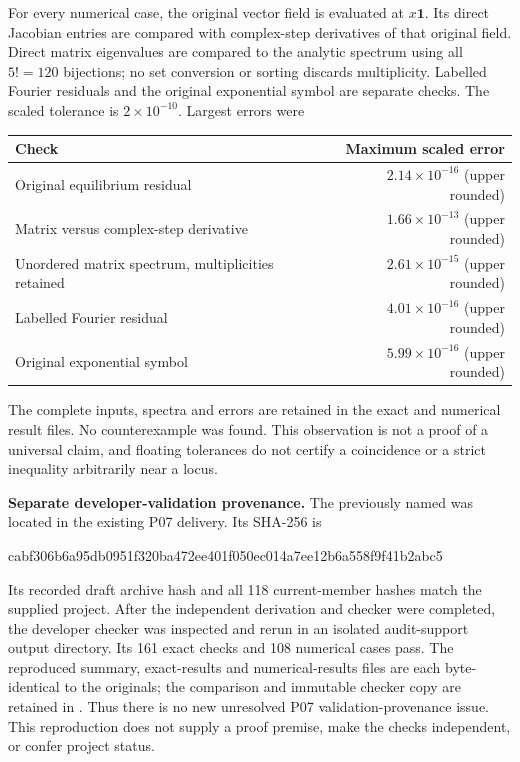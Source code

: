 \documentclass[11pt]{article}
\newcommand{\one}{\mathbf{1}}
\newcommand{\sha}[2]{\par{\small\ttfamily #1\allowbreak #2}\par}
\begin{document}
For every numerical case, the original vector field is evaluated at
$x\one$. Its direct Jacobian entries are compared with complex-step
derivatives of that original field. Direct matrix eigenvalues are
compared to the analytic spectrum using all $5!=120$ bijections;
no set conversion or sorting discards multiplicity. Labelled Fourier
residuals and the original exponential symbol are separate checks.
The scaled tolerance is $2\times10^{-10}$. Largest errors were
\begin{center}
\begin{tabular}{@{}lr@{}}
\toprule Check&Maximum scaled error\\\midrule
Original equilibrium residual&$2.14\times10^{-16}$ (upper rounded)\\
Matrix versus complex-step derivative&$1.66\times10^{-13}$ (upper rounded)\\
Unordered matrix spectrum, multiplicities retained&$2.61\times10^{-15}$ (upper rounded)\\
Labelled Fourier residual&$4.01\times10^{-16}$ (upper rounded)\\
Original exponential symbol&$5.99\times10^{-16}$ (upper rounded)\\\bottomrule
\end{tabular}
\end{center}
The complete inputs, spectra and errors are retained in the exact and
numerical result files. No counterexample was found. This observation
is not a proof of a universal claim, and floating tolerances do not
certify a coincidence or a strict inequality arbitrarily near a locus.

\textbf{Separate developer-validation provenance.}
The previously named  was located in
the existing P07 delivery. Its SHA-256 is
\sha{cabf306b6a95db0951f320ba472ee401}{f050ec014a7ee12b6a558f9f41b2abc5}
Its recorded draft archive hash and all 118 current-member hashes match
the supplied project. After the independent derivation and checker
were completed, the developer checker was inspected and rerun in an
isolated audit-support output directory. Its 161 exact checks and
108 numerical cases pass. The reproduced summary, exact-results and
numerical-results files are each byte-identical to the originals;
the comparison and immutable checker copy are retained in
. Thus there is no new unresolved
P07 validation-provenance issue. This reproduction does not supply a
proof premise, make the checks independent, or confer project status.
\end{document}
